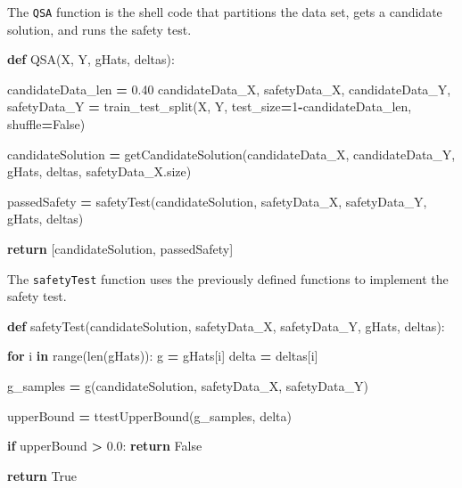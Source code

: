 \documentclass[12pt, twoside]{amherstthesis}
\newenvironment{Shaded}{\begin{snugshade}}{\end{snugshade}}
\newcommand{\BuiltInTok}[1]{#1}
\newcommand{\ControlFlowTok}[1]{\textcolor[rgb]{0.13,0.29,0.53}{\textbf{#1}}}
\newcommand{\DecValTok}[1]{\textcolor[rgb]{0.00,0.00,0.81}{#1}}
\newcommand{\FloatTok}[1]{\textcolor[rgb]{0.00,0.00,0.81}{#1}}
\newcommand{\KeywordTok}[1]{\textcolor[rgb]{0.13,0.29,0.53}{\textbf{#1}}}
\newcommand{\NormalTok}[1]{#1}
\newcommand{\OperatorTok}[1]{\textcolor[rgb]{0.81,0.36,0.00}{\textbf{#1}}}
\newcommand{\VariableTok}[1]{\textcolor[rgb]{0.00,0.00,0.00}{#1}}
\begin{document}
\noindent The \texttt{QSA} function is the shell code that partitions the data set, gets a candidate solution, and runs the safety test.
\begin{Shaded}
\begin{Highlighting}[]
\KeywordTok{def}\NormalTok{ QSA(X, Y, gHats, deltas):}

\NormalTok{    candidateData\_len }\OperatorTok{=} \FloatTok{0.40}
\NormalTok{    candidateData\_X, safetyData\_X, candidateData\_Y, safetyData\_Y }\OperatorTok{=} 
\NormalTok{    train\_test\_split(X, Y, test\_size}\OperatorTok{=}\DecValTok{1}\OperatorTok{{-}}\NormalTok{candidateData\_len, shuffle}\OperatorTok{=}\VariableTok{False}\NormalTok{)}
  
\NormalTok{    candidateSolution }\OperatorTok{=}\NormalTok{ getCandidateSolution(candidateData\_X, }
\NormalTok{    candidateData\_Y, gHats, deltas, safetyData\_X.size)}

\NormalTok{    passedSafety      }\OperatorTok{=}\NormalTok{ safetyTest(candidateSolution, safetyData\_X, }
\NormalTok{    safetyData\_Y, gHats, deltas)}

    \ControlFlowTok{return}\NormalTok{ [candidateSolution, passedSafety]}
\end{Highlighting}
\end{Shaded}
\noindent The \texttt{safetyTest} function uses the previously defined functions to implement the safety test.
\begin{Shaded}
\begin{Highlighting}[]
\KeywordTok{def}\NormalTok{ safetyTest(candidateSolution, safetyData\_X, safetyData\_Y, gHats, }
\NormalTok{deltas):}

    \ControlFlowTok{for}\NormalTok{ i }\KeywordTok{in} \BuiltInTok{range}\NormalTok{(}\BuiltInTok{len}\NormalTok{(gHats)):  }
\NormalTok{        g         }\OperatorTok{=}\NormalTok{ gHats[i]  }
\NormalTok{        delta     }\OperatorTok{=}\NormalTok{ deltas[i] }

    
\NormalTok{        g\_samples }\OperatorTok{=}\NormalTok{ g(candidateSolution, safetyData\_X, safetyData\_Y) }

\NormalTok{        upperBound }\OperatorTok{=}\NormalTok{ ttestUpperBound(g\_samples, delta) }

        \ControlFlowTok{if}\NormalTok{ upperBound }\OperatorTok{\textgreater{}} \FloatTok{0.0}\NormalTok{: }
            \ControlFlowTok{return} \VariableTok{False}

    \ControlFlowTok{return} \VariableTok{True}
\end{Highlighting}
\end{Shaded}
\end{document}
